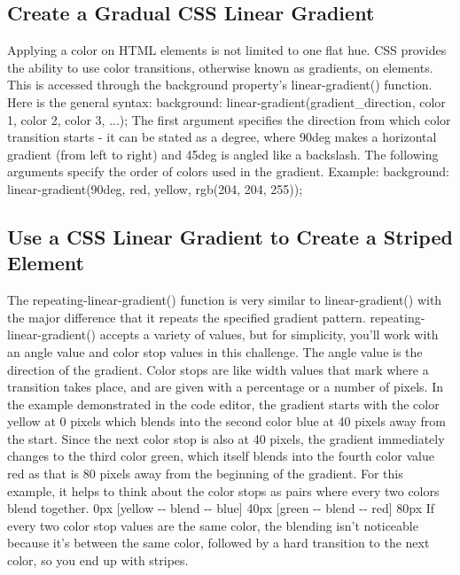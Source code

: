 \documentclass{article}%
\begin{document}
%
\subsection{Create a Gradual CSS Linear Gradient}%
\label{subsec:CreateaGradualCSSLinearGradient}%
Applying a color on HTML elements is not limited to one flat hue. CSS provides the ability to use color transitions, otherwise known as gradients, on elements. This is accessed through the background property's linear{-}gradient() function. Here is the general syntax:\newline%
background: linear{-}gradient(gradient\_direction, color 1, color 2, color 3, ...);\newline%
The first argument specifies the direction from which color transition starts {-} it can be stated as a degree, where 90deg makes a horizontal gradient (from left to right) and 45deg is angled like a backslash. The following arguments specify the order of colors used in the gradient.\newline%
Example:\newline%
background: linear{-}gradient(90deg, red, yellow, rgb(204, 204, 255));\newline%

%
\subsection{Use a CSS Linear Gradient to Create a Striped Element}%
\label{subsec:UseaCSSLinearGradienttoCreateaStripedElement}%
The repeating{-}linear{-}gradient() function is very similar to linear{-}gradient() with the major difference that it repeats the specified gradient pattern. repeating{-}linear{-}gradient() accepts a variety of values, but for simplicity, you'll work with an angle value and color stop values in this challenge.\newline%
The angle value is the direction of the gradient. Color stops are like width values that mark where a transition takes place, and are given with a percentage or a number of pixels.\newline%
In the example demonstrated in the code editor, the gradient starts with the color yellow at 0 pixels which blends into the second color blue at 40 pixels away from the start. Since the next color stop is also at 40 pixels, the gradient immediately changes to the third color green, which itself blends into the fourth color value red as that is 80 pixels away from the beginning of the gradient.\newline%
For this example, it helps to think about the color stops as pairs where every two colors blend together.\newline%
0px {[}yellow {-}{-} blend {-}{-} blue{]} 40px {[}green {-}{-} blend {-}{-} red{]} 80px\newline%
If every two color stop values are the same color, the blending isn't noticeable because it's between the same color, followed by a hard transition to the next color, so you end up with stripes.\newline%
\end{document}
